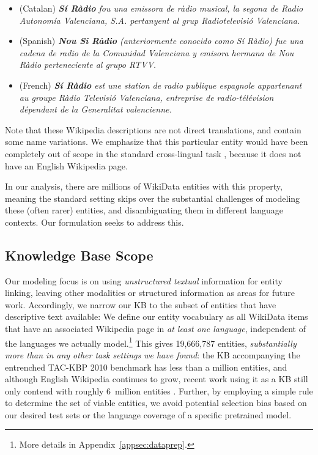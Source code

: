 \documentclass[11pt,a4paper]{article}
\begin{document}
\begin{itemize}
 \item (Catalan) \emph{\textbf{Sí Ràdio} fou una emissora de ràdio musical, la segona de Radio Autonomía Valenciana, S.A. pertanyent al grup Radiotelevisió Valenciana.}
 \item (Spanish) \emph{\textbf{Nou Si Ràdio} (anteriormente conocido como Sí Ràdio) fue una cadena de radio de la Comunidad Valenciana y emisora hermana de Nou Ràdio perteneciente al grupo RTVV.}
 \item (French) \emph{\textbf{Sí Ràdio} est une station de radio publique espagnole appartenant au groupe Ràdio Televisió Valenciana, entreprise de radio-télévision dépendant de la Generalitat valencienne.}
\end{itemize}

Note that these Wikipedia descriptions are not direct translations, and contain some name variations.
We emphasize that this particular entity would have been completely out of scope in the standard cross-lingual task \citep{tsai-roth-2016-cross}, because it does not have an English Wikipedia page.

In our analysis, there are millions of WikiData entities with this property, meaning the standard setting skips over the substantial challenges of modeling these (often rarer) entities, and disambiguating them in different language contexts.
Our formulation seeks to address this.

\subsection{Knowledge Base Scope}
Our modeling focus is on using \emph{unstructured textual} information for entity linking,
leaving other modalities or structured information as areas for future work.
Accordingly, we narrow our KB to the subset of entities that have descriptive text available:
We define our entity vocabulary  as all WikiData items that have an associated Wikipedia page in \emph{at least one language}, independent of the languages we actually model.\footnote{More details in Appendix~\ref{appsec:dataprep}.}
This gives 19,666,787 entities,
\emph{substantially more than in any other task settings we have found}: the KB accompanying the entrenched TAC-KBP 2010 benchmark \citep{ji2010overview} has less than a million entities, and although English Wikipedia continues to grow, recent work using it as a KB still only contend with roughly 6~million entities \citep{fevry2020empirical,zhou_tacl2020}.
Further, by employing a simple rule to determine the set of viable entities, we avoid potential selection bias based on our desired test sets or the language coverage of a specific pretrained model.
\end{document}
